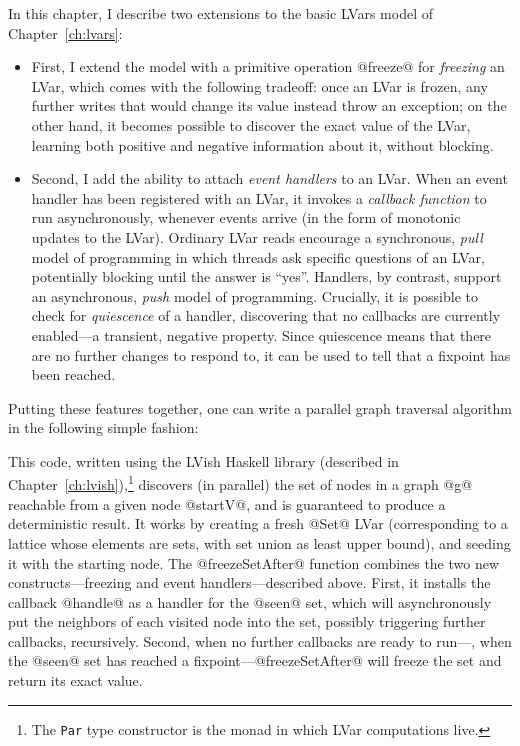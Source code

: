 In this chapter, I describe two extensions to the basic LVars model of
Chapter~\ref{ch:lvars}:

\begin{itemize}
\item First, I extend the model with a primitive operation @freeze@
  for \emph{freezing} an LVar, which comes with the following
  tradeoff: once an LVar is frozen, any further writes that would
  change its value instead throw an exception; on the other hand, it
  becomes possible to discover the exact value of the LVar, learning
  both positive and negative information about it, without blocking.
\item
  Second, I add the ability to attach \emph{event handlers} to an
  LVar.  When an event handler has been registered with an LVar, it
  invokes a \emph{callback function} to run asynchronously, whenever
  events arrive (in the form of monotonic updates to the LVar).
  Ordinary LVar reads encourage a synchronous, \emph{pull} model of
  programming in which threads ask specific questions of an LVar,
  potentially blocking until the answer is ``yes''.  Handlers, by
  contrast, support an asynchronous, \emph{push} model of programming.
  Crucially, it is possible to check for \emph{quiescence} of a
  handler, discovering that no callbacks are currently enabled---a
  transient, negative property.  Since quiescence means that there are
  no further changes to respond to, it can be used to tell that a
  fixpoint has been reached.
\end{itemize}

Putting these features together, one can write a parallel graph
traversal algorithm in the following simple fashion:



This code, written using the LVish Haskell library (described in
Chapter~\ref{ch:lvish}),\footnote{The \lstinline|Par| type constructor
  is the monad in which LVar computations live.}  discovers (in
parallel) the set of nodes in a graph @g@ reachable from a given node
@startV@, and is guaranteed to produce a deterministic result.  It
works by creating a fresh @Set@ LVar (corresponding to a lattice whose
elements are sets, with set union as least upper bound), and seeding
it with the starting node.  The @freezeSetAfter@ function combines the
two new constructs---freezing and event handlers---described above.
First, it installs the callback @handle@ as a handler for the @seen@
set, which will asynchronously put the neighbors of each visited node
into the set, possibly triggering further callbacks, recursively.
Second, when no further callbacks are ready to run---\ie, when the
@seen@ set has reached a fixpoint---@freezeSetAfter@ will freeze the
set and return its exact value.

